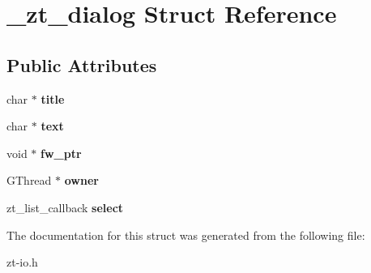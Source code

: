 \hypertarget{struct__zt__dialog}{\section{\-\_\-zt\-\_\-dialog Struct Reference}
\label{struct__zt__dialog}
}
\subsection*{Public Attributes}
\begin{DoxyCompactItemize}
\item 
\hypertarget{struct__zt__dialog_aa5704f6a4b14924c8e1ded3a28d1b874}{char $\ast$ {\bfseries title}}\label{struct__zt__dialog_aa5704f6a4b14924c8e1ded3a28d1b874}

\item 
\hypertarget{struct__zt__dialog_a25b3ffb6743bc4063827d5f6255734a6}{char $\ast$ {\bfseries text}}\label{struct__zt__dialog_a25b3ffb6743bc4063827d5f6255734a6}

\item 
\hypertarget{struct__zt__dialog_ad52ecfd74457263023122db2dbd876ce}{void $\ast$ {\bfseries fw\-\_\-ptr}}\label{struct__zt__dialog_ad52ecfd74457263023122db2dbd876ce}

\item 
\hypertarget{struct__zt__dialog_a63576595f4d00d55565f6ec7f8f5945e}{G\-Thread $\ast$ {\bfseries owner}}\label{struct__zt__dialog_a63576595f4d00d55565f6ec7f8f5945e}

\item 
\hypertarget{struct__zt__dialog_a58f98ec4d66c71d2e25fa3ba1ee1b1df}{zt\-\_\-list\-\_\-callback {\bfseries select}}\label{struct__zt__dialog_a58f98ec4d66c71d2e25fa3ba1ee1b1df}

\end{DoxyCompactItemize}


The documentation for this struct was generated from the following file\-:\begin{DoxyCompactItemize}
\item 
zt-\/io.\-h\end{DoxyCompactItemize}
